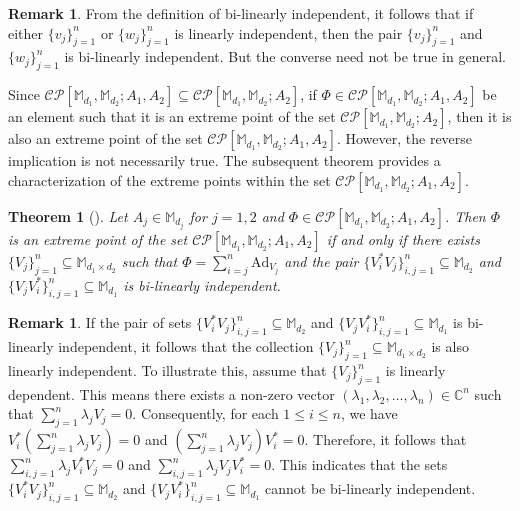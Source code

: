 \documentclass[10pt,reqno]{amsart}
\theoremstyle{definition}
\newtheorem{rmk}[defn]{Remark}
\theoremstyle{plain}
\newtheorem{thm}[defn]{Theorem}
\theoremstyle{remark}
\newcommand{\mbb}[1]{\mathbb{#1}}
\newcommand{\msc}[1]{\mathscr{#1}}
\newcommand{\M}[1]{\mbb{M}_{#1}}%
\numberwithin{equation}{section}%
\begin{document}
 
 
 \begin{rmk}
 	From the definition of bi-linearly independent, it follows that if either $\{v_j\}_{j=1}^{n}$ or $\{w_j\}_{j=1}^{n}$ is linearly independent, then the pair  $\{v_j\}_{j=1}^{n}$ and $\{w_j\}_{j=1}^{n}$ is bi-linearly independent. But the converse need not be true in general.
 \end{rmk}
 
 
 
 Since $\msc{CP}[\M{d_1},\M{d_2}; A_1, A_2]\subseteq \msc{CP}[\M{d_1},\M{d_2}; A_2]$, if $\Phi\in\msc{CP}[\M{d_1},\M{d_2}; A_1, A_2]$ be an element such that it is an extreme point of the set $\msc{CP}[\M{d_1},\M{d_2}; A_2]$, then it is also an extreme point of the set $\msc{CP}[\M{d_1},\M{d_2}; A_1, A_2]$. However, the reverse implication is not necessarily true. The subsequent theorem provides a characterization of the extreme points within the set $\msc{CP}[\M{d_1},\M{d_2}; A_1, A_2]$.
 
 
 
 \begin{thm}[\cite{LaSt93, krp98, Ru04}]\label{thm-extr-condition-for doubly}
 	Let $A_j\in\M{d_j}$ for $j=1,2$ and $\Phi\in \msc{CP}[\M{d_1},\M{d_2}; A_1,A_2]$. Then $\Phi$ is an extreme point of the set $ \msc{CP}[\M{d_1},\M{d_2}; A_1,A_2]$ if and only if there exists $\{V_j\}_{j=1}^n\subseteq \M{d_1\times d_2}$ such that $\Phi=\sum_{i=j}^n\mathrm{Ad}_{V_j}$ and the pair
 	$\{V_i^*V_j\}_{i,j=1}^{n}\subseteq\M{d_2}$ and $\{V_jV_i^*\}_{i,j=1}^{n}\subseteq\M{d_1}$ is bi-linearly independent.
 \end{thm}
 
 
 
 \begin{rmk}
 	If the pair of sets $\{V_i^*V_j\}_{i,j=1}^{n}\subseteq\M{d_2}$ and $\{V_jV_i^*\}_{i,j=1}^{n}\subseteq\M{d_1}$ is bi-linearly independent, it follows that the collection $\{V_j\}_{j=1}^n\subseteq\M{d_1\times d_2}$ is also linearly independent. To illustrate this, assume that $\{V_j\}_{j=1}^n$ is linearly dependent. This means there exists a non-zero vector $(\lambda_1,\lambda_2,\hdots,\lambda_n)\in\mbb{C}^n$ such that $\sum_{j=1}^n\lambda_jV_j=0$. Consequently, for each $1\leq i\leq n$, we have $V_i^*\left(\sum_{j=1}^n\lambda_jV_j\right)=0$ and $\left(\sum_{j=1}^n\lambda_jV_j\right)V_i^*=0$. Therefore, it follows that $\sum_{i,j=1}^n\lambda_j V_i^*V_j=0$ and $\sum_{i,j=1}^n\lambda_jV_jV_i^*=0$. This indicates that the sets $\{V_i^*V_j\}_{i,j=1}^{n}\subseteq\M{d_2}$ and $\{V_jV_i^*\}_{i,j=1}^{n}\subseteq\M{d_1}$ cannot be bi-linearly independent.
 \end{rmk}
 
\end{document}
